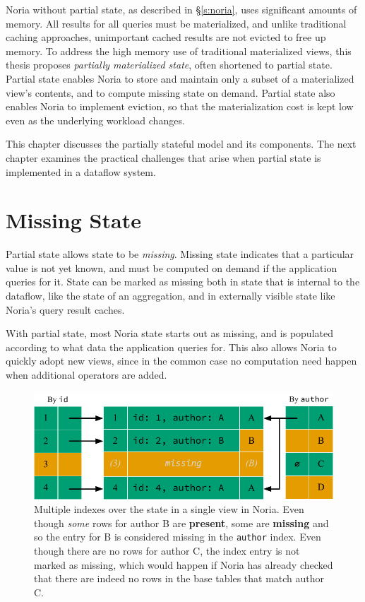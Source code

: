Noria without partial state, as described in \S\ref{s:noria}, uses significant
amounts of memory. All results for all queries must be materialized, and unlike
traditional caching approaches, unimportant cached results are not evicted to
free up memory. To address the high memory use of traditional materialized
views, this thesis proposes \textit{partially materialized state}, often
shortened to partial state. Partial state enables Noria to store and maintain
only a subset of a materialized view's contents, and to compute missing state on
demand. Partial state also enables Noria to implement eviction, so that the
materialization cost is kept low even as the underlying workload changes.

This chapter discusses the partially stateful model and its components. The next
chapter examines the practical challenges that arise when partial state is
implemented in a dataflow system.

\section{Missing State}
\label{s:missing}

Partial state allows state to be \textit{missing}. Missing state indicates that
a particular value is not yet known, and must be computed on demand if the
application queries for it. State can be marked as missing both in state that is
internal to the dataflow, like the state of an aggregation, and in externally
visible state like Noria's query result caches.

With partial state, most Noria state starts out as missing, and is populated
according to what data the application queries for. This also allows Noria to
quickly adopt new views, since in the common case no computation need happen
when additional operators are added.

\begin{figure}
  \centering
  \includegraphics{diagrams/Indexing.pdf}
  \caption{Multiple indexes over the state in a single view in Noria. Even
  though \emph{some} rows for author B are \textbf{\color{set3}present}, some
  are \textbf{\color{set2}missing} and so the entry for B is considered missing
  in the \texttt{author} index. Even though there are no rows for author C, the
  index entry is not marked as missing, which would happen if Noria has already
  checked that there are indeed no rows in the base tables that match author C.}
  \label{f:indexing}
\end{figure}

